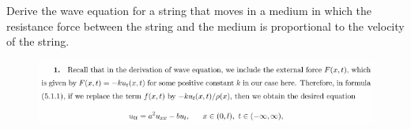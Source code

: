 \begin{question}{5.1}{}
    Derive the wave equation for a string that moves in a medium in which the resistance force between the string and the medium is proportional to the velocity of the string.
\end{question}
\begin{figure}[H]
    \includegraphics[width=.9\textwidth]{figures/5.1-1.png}
\end{figure}


